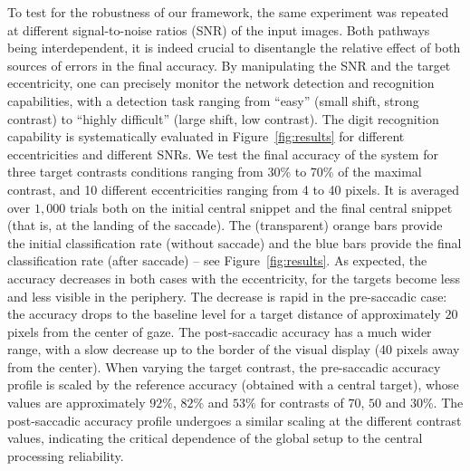 To test for the robustness of our framework, the same experiment was repeated at different signal-to-noise ratios (SNR) of the input images. Both pathways being interdependent, it is indeed crucial to disentangle the relative effect of both sources of errors in the final accuracy. By manipulating the SNR and the target eccentricity, one can precisely monitor the network detection and recognition capabilities, with a detection task ranging from ``easy'' (small shift, strong contrast) to ``highly difficult'' (large shift, low contrast). The digit recognition capability is systematically evaluated in Figure~\ref{fig:results} for different eccentricities and different SNRs. We test the final accuracy of the system for three target contrasts conditions ranging from 30\% to 70\% of the maximal contrast, and 10 different eccentricities ranging from 4 to 40 pixels. It is averaged over $1,000$ trials both on the initial central snippet and the final central snippet (that is, at the landing of the saccade). The (transparent) orange bars provide the initial classification rate (without saccade) and the blue bars provide the final classification rate (after saccade) -- see Figure~\ref{fig:results}. As expected, the accuracy decreases in both cases with the eccentricity, for the targets become less and less visible in the periphery. The decrease is rapid in the pre-saccadic case: the accuracy drops to the baseline level for a target distance of approximately $20$ pixels from the center of gaze. The post-saccadic accuracy has a much wider range, with a slow decrease up to the border of the visual display (40 pixels away from the center).
When varying the target contrast, the pre-saccadic accuracy profile is scaled by the reference accuracy (obtained with a central target), whose values are approximately $92\%$, $82\%$ and $53\%$ for contrasts of $70$, $50$ and $30$\%. The post-saccadic accuracy profile undergoes a similar scaling at the different contrast values, indicating the critical dependence of the global setup to the central processing reliability.

